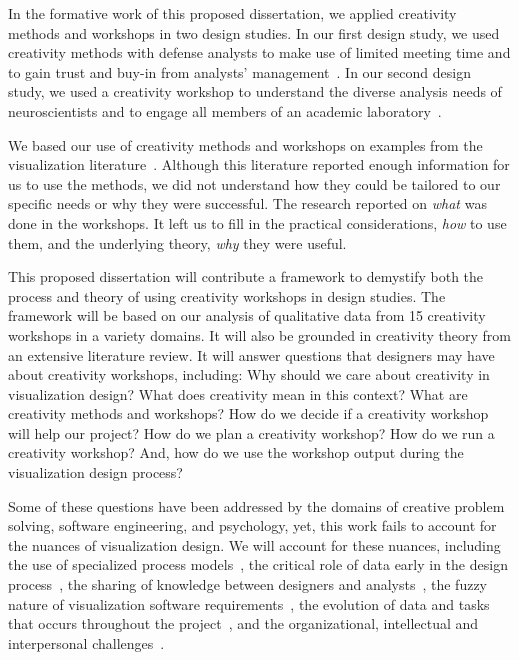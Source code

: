 In the formative work of this proposed dissertation, we applied creativity methods and workshops in two design studies. In our first design study, we used creativity methods with defense analysts to make use of limited meeting time and to gain trust and buy-in from analysts' management~\cite{Kerzner2015}. In our second design study, we used a creativity workshop to understand the diverse analysis needs of neuroscientists and to engage all members of an academic laboratory~\cite{Kerzner2017}. 

We based our use of creativity methods and workshops on examples from the visualization literature~\cite{Goodwin2013,Dykes2010,Walker2013,Lloyd2011}. Although this literature reported enough information for us to use the methods, we did not understand how they could be tailored to our specific needs or why they were successful. The research reported on \emph{what} was done in the workshops. It left us to fill in the practical considerations, \emph{how} to use them, and the underlying theory, \emph{why} they were useful. 

This proposed dissertation will contribute a framework to demystify both the process and theory of using creativity workshops in design studies. The framework will be based on our analysis of qualitative data from 15 creativity workshops in a variety domains. It will also be grounded in creativity theory from an extensive literature review. It will answer questions that designers may have about creativity workshops, including: Why should we care about creativity in visualization design? What does creativity mean in this context? What are creativity methods and workshops? How do we decide if a creativity workshop will help our project? How do we plan a creativity workshop? How do we run a creativity workshop? And, how do we use the workshop output during the visualization design process?

Some of these questions have been addressed by the domains of creative problem solving, software engineering, and psychology, yet, this work fails to account for the nuances of visualization design. We will account for these nuances, including the use of specialized process models~\cite{Tory2004a}, the critical role of data early in the design process~\cite{Munzner2009}, the sharing of knowledge between designers and analysts~\cite{Wijk2006}, the fuzzy nature of visualization software requirements~\cite{Sedlmair2012}, the evolution of data and tasks that occurs throughout the project~\cite{McCurdy2016_Action}, and the organizational, intellectual and interpersonal challenges~\cite{Sedlmair2012}.


